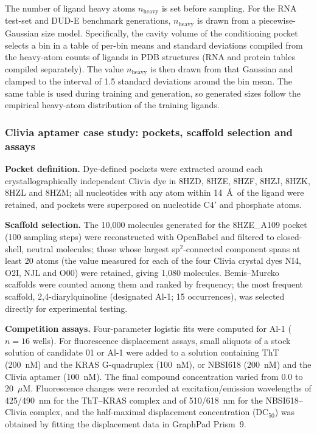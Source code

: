 \documentclass[pdflatex,sn-mathphys-num]{sn-jnl}
\theoremstyle{thmstyleone}
\theoremstyle{thmstyletwo}
\theoremstyle{thmstylethree}
\begin{document}
The number of ligand heavy atoms \(n_{\text{heavy}}\) is set before sampling. For the RNA test-set and DUD-E benchmark generations, \(n_{\text{heavy}}\) is drawn from a piecewise-Gaussian size model. Specifically, the cavity volume of the conditioning pocket selects a bin in a table of per-bin means and standard deviations compiled from the heavy-atom counts of ligands in PDB structures (RNA and protein tables compiled separately). The value \(n_{\text{heavy}}\) is then drawn from that Gaussian and clamped to the interval of 1.5 standard deviations around the bin mean. The same table is used during training and generation, so generated sizes follow the empirical heavy-atom distribution of the training ligands.

\subsubsection{Clivia aptamer case study: pockets, scaffold selection and assays}

\textbf{Pocket definition.} Dye-defined pockets were extracted around each crystallographically independent Clivia dye in 8HZD, 8HZE, 8HZF, 8HZJ, 8HZK, 8HZL and 8HZM; all nucleotides with any atom within 14~\AA\ of the ligand were retained, and pockets were superposed on nucleotide C4$'$ and phosphate atoms.

\textbf{Scaffold selection.} The 10,000 molecules generated for the 8HZE\_A109 pocket (100 sampling steps) were reconstructed with OpenBabel and filtered to closed-shell, neutral molecules; those whose largest sp$^{2}$-connected component spans at least 20 atoms (the value measured for each of the four Clivia crystal dyes NI4, O2I, NJL and O00) were retained, giving 1,080 molecules. Bemis--Murcko scaffolds were counted among them and ranked by frequency; the most frequent scaffold, 2,4-diarylquinoline (designated Al-1; 15 occurrences), was selected directly for experimental testing.

\textbf{Competition assays.} Four-parameter logistic fits were computed for Al-1 ($n=16$ wells). For fluorescence displacement assays, small aliquots of a stock solution of candidate 01 or Al-1 were added to a solution containing ThT (200~nM) and the KRAS G-quadruplex (100~nM), or NBSI618 (200~nM) and the Clivia aptamer (100~nM). The final compound concentration varied from 0.0 to 20~$\mu$M. Fluorescence changes were recorded at excitation/emission wavelengths of 425/490~nm for the ThT--KRAS complex and of 510/618~nm for the NBSI618--Clivia complex, and the half-maximal displacement concentration (DC$_{50}$) was obtained by fitting the displacement data in GraphPad Prism~9.
\end{document}
